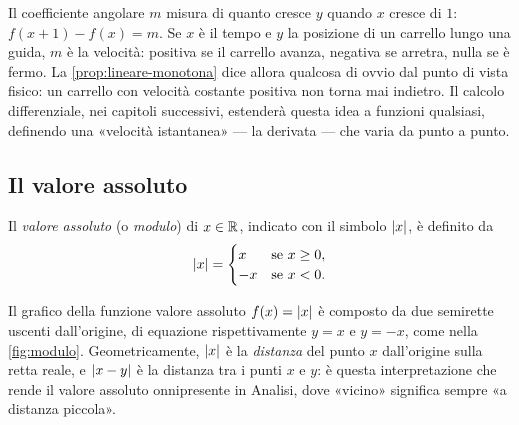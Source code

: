 \begin{idea}
Il coefficiente angolare $m$ misura di quanto cresce $y$ quando $x$ cresce di $1$:
$f(x+1)-f(x)=m$. Se $x$ è il tempo e $y$ la posizione di un carrello lungo una guida,
$m$ è la velocità: positiva se il carrello avanza, negativa se arretra, nulla se è fermo.
La \cref{prop:lineare-monotona} dice allora qualcosa di ovvio dal punto di vista
fisico: un carrello con velocità costante positiva non torna mai indietro. Il calcolo
differenziale, nei capitoli successivi, estenderà questa idea a funzioni qualsiasi,
definendo una «velocità istantanea» --- la derivata --- che varia da punto a punto.
\end{idea}

\subsection{Il valore assoluto}

\begin{definizione}
Il \emph{valore assoluto} (o \emph{modulo}) di $x\in\mathbb{R}$, indicato con il simbolo
$\lvert x\rvert$, è definito da
\begin{equation}\label{eq:modulo}
  \lvert x\rvert=\begin{cases} x & \text{se } x\ge0,\\ -x & \text{se } x<0. \end{cases}
\end{equation}
\end{definizione}

\begin{marginfigure}
\centering
{}
\caption{Il grafico della funzione valore assoluto è l'unione della semiretta $y=x$,
per $x\ge0$, e della semiretta $y=-x$, per $x<0$.}
\label{fig:modulo}
\end{marginfigure}

Il grafico della funzione valore assoluto $f(x)=\lvert x\rvert$ è composto da due semirette
uscenti dall'origine, di equazione rispettivamente $y=x$ e $y=-x$, come nella
\cref{fig:modulo}. Geometricamente, $\lvert x\rvert$ è la \emph{distanza} del punto $x$
dall'origine sulla retta reale, e $\lvert x-y\rvert$ è la distanza tra i punti $x$ e $y$: è
questa interpretazione che rende il valore assoluto onnipresente in Analisi, dove
«vicino» significa sempre «a distanza piccola».

